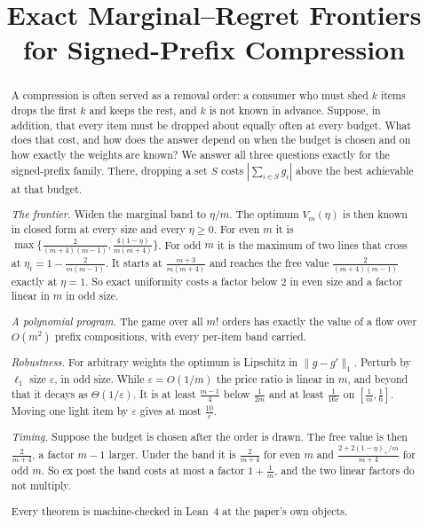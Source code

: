 



\title{Exact Marginal--Regret Frontiers\\for Signed-Prefix Compression}

\author{
}

\maketitle

\begin{abstract}
A compression is often served as a removal order: a consumer who must shed $k$ items drops
the first $k$ and keeps the rest, and $k$ is not known in advance. Suppose, in addition, that
every item must be dropped about equally often at every budget. What does that cost, and how
does the answer depend on when the budget is chosen and on how exactly the weights are known?
We answer all three questions exactly for the signed-prefix family. There, dropping a set $S$
costs $|\sum_{i\in S}g_{i}|$ above the best achievable at that budget.

\emph{The frontier.} Widen the marginal band to $\eta/m$. The optimum $V_{m}(\eta)$ is then
known in closed form at every size and every $\eta\ge0$. For even $m$ it is
$\max\{\frac{2}{(m+4)(m-1)},\frac{4(1-\eta)}{m(m+4)}\}$. For odd $m$ it is the maximum of
two lines that cross at $\eta_{t}=1-\frac{2}{m(m-1)}$. It starts at $\frac{m+3}{m(m+4)}$ and
reaches the free value $\frac{2}{(m+4)(m-1)}$ exactly at $\eta=1$. So exact uniformity costs
a factor below $2$ in even size and a factor linear in $m$ in odd size.

\emph{A polynomial program.} The game over all $m!$ orders has exactly the value of a flow
over $O(m^{2})$ prefix compositions, with every per-item band carried.

\emph{Robustness.} For arbitrary weights the optimum is Lipschitz in $\|g-g'\|_{1}$. Perturb
by $\ell_{1}$ size $\varepsilon$, in odd size. While $\varepsilon=O(1/m)$ the price ratio is
linear in $m$, and beyond that it decays as $\Theta(1/\varepsilon)$. It is at least
$\frac{m-1}{4}$ below $\frac{1}{2m}$ and at least $\frac{1}{16\varepsilon}$ on
$[\frac1m,\frac16]$. Moving one light item by $\varepsilon$ gives at most
$\frac{10}{\varepsilon}$.

\emph{Timing.} Suppose the budget is chosen after the order is drawn. The free value is then
$\frac{2}{m+4}$, a factor $m-1$ larger. Under the band it is $\frac{2}{m+4}$ for even $m$
and $\frac{2+2(1-\eta)_{+}/m}{m+4}$ for odd $m$. So ex post the band costs at most a factor
$1+\frac1m$, and the two linear factors do not multiply.

Every theorem is machine-checked in Lean~4 at the paper's own objects.
\end{abstract}

